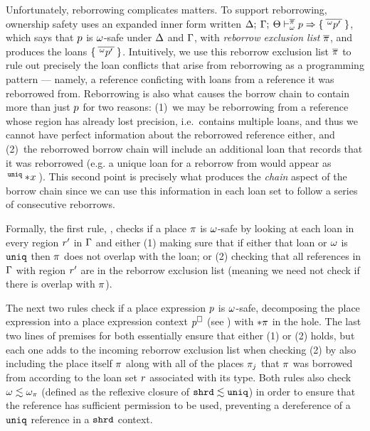 Unfortunately, reborrowing complicates matters. To support reborrowing,
ownership safety uses an expanded inner form written $ \Delta; \: \Gamma; \: \Theta \vdash^{ \overline{\pi} }_{\omega} p \Rightarrow  \{ \: \overline{\,^{\omega}p^\prime\,} \: \}  $,
which says that $p$ is $\omega$-safe under $\Delta$ and
$\Gamma$, with \emph{reborrow exclusion list} $\overline{\pi}$, and
produces the loans
$\{ \: \overline{\,^{\omega}p^\prime\,} \: \}$. Intuitively, we
use this reborrow exclusion list $\overline{\pi}$ to rule out precisely the
loan conflicts that arise from reborrowing as a programming pattern --- namely,
a reference conficting with loans from a reference it was reborrowed from.
Reborrowing is also what causes the borrow chain to contain more than just
$p$ for two reasons: (1)~we may be reborrowing from a reference whose
region has already lost precision, i.e.\ contains multiple loans, and thus we
cannot have perfect information about the reborrowed reference either, and
(2)~the reborrowed borrow chain will include an additional loan that records
that it was reborrowed (e.g. a unique loan for a reborrow from  would
appear as $\,^{\mathtt{uniq}}* \! x\,$). This second point is precisely
what produces the \emph{chain} aspect of the borrow chain since we can use this
information in each loan set to follow a series of consecutive reborrows.

Formally, the first rule, , checks if a place $\pi$ is
$\omega$-safe by looking at each loan in every region $r^\prime$ in
$\Gamma$ and either (1) making sure that if either that loan or $\omega$ is
$\mathtt{uniq}$ then $\pi$ does not overlap with the loan; or (2) checking that
all references in $\Gamma$ with region $r^{\prime}$ are in the
reborrow exclusion list (meaning we need not check if there is overlap with
$\pi$).

The next two rules check if a place expression $p$ is $\omega$-safe,
decomposing the place expression into a place expression context
$p^\square$ (see ) with $* \pi$ in the
hole. The last two lines of premises for both essentially ensure that either (1)
or (2) holds, but each one adds to the incoming reborrow exclusion list when
checking (2) by also including the place itself $\pi$ along with all of the
places $\pi_j$ that $\pi$ was borrowed from according to the loan set
$r$ associated with its type. Both rules also check
$\omega \lesssim \omega_{\pi}$ (defined as the reflexive closure of
$\mathtt{shrd} \lesssim \mathtt{uniq}$) in order to ensure that the reference has sufficient
permission to be used, preventing a dereference of a $\mathtt{uniq}$ reference in a
$\mathtt{shrd}$ context.

